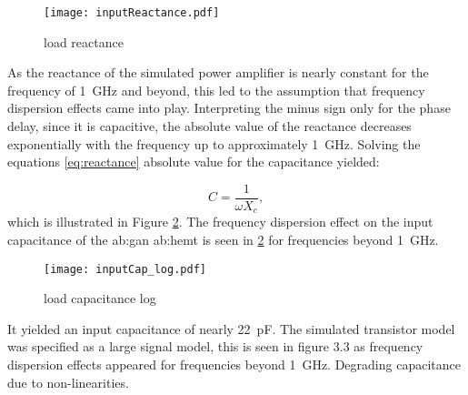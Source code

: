 \begin{figure}[ht]
	\centering
  \texttt{[image: inputReactance.pdf]}
	\caption{load reactance}
	\label{fig:inputReactance}
\end{figure}

As the reactance of the simulated power amplifier is nearly constant for the frequency of \SI{1}{\giga \hertz} and beyond, this led to the assumption that frequency dispersion effects came into play.
Interpreting the minus sign only for the phase delay, since it is capacitive, the absolute value of the reactance decreases exponentially with the frequency up to approximately \SI{1}{\giga \hertz}.
Solving the equations \ref{eq:reactance} absolute value for the capacitance yielded:

\begin{equation}
	C = \frac{1}{\omega X_c},
\end{equation}
which is illustrated in Figure \ref{fig:inputCap_log}.
The frequency dispersion effect on the input capacitance of the \gls{ab:gan} \gls{ab:hemt} is seen in \ref{fig:inputCap_log} for frequencies beyond \SI{1}{\giga \hertz}.

\begin{figure}[ht]
	\centering
  \texttt{[image: inputCap\_log.pdf]}
	\caption{load capacitance log}
	\label{fig:inputCap_log}
\end{figure}

It yielded an input capacitance of nearly \SI{22}{\pico \farad}.
The simulated transistor model was specified as a large signal model, this is seen in figure 3.3 as frequency dispersion effects appeared for frequencies beyond \SI{1}{\giga \hertz}.
%
%
%
Degrading capacitance due to non-linearities.



